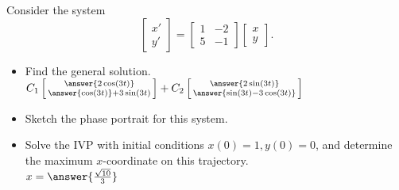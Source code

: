 \documentclass{ximera}
\begin{document}
\begin{exercise}
    Consider the system
    \begin{equation*}
        \begin{bmatrix} 
            x' \\ 
            y' 
        \end{bmatrix} 
        = 
        \begin{bmatrix} 
            1& -2 \\ 
            5 & -1 
        \end{bmatrix} 
        \begin{bmatrix} 
            x \\ 
            y 
        \end{bmatrix}.
    \end{equation*} %
    \begin{itemize}
        \item Find the general solution.\\
            $C_1\left[\begin{smallmatrix} \answer{2\cos(3t)} \\ \answer{\cos(3t)} + 3\sin(3t) \end{smallmatrix}\right] + C_2 \left[\begin{smallmatrix} \answer{2\sin(3t)} \\ \answer{\sin(3t) - 3\cos(3t)} \end{smallmatrix}\right]$
        \item Sketch the phase portrait for this system.
        \item Solve the IVP with initial conditions $x(0)=1, y(0)=0$, and determine the maximum $x$-coordinate on this trajectory.\\
            $x = \answer{\frac{\sqrt{10}}{3}}$
    \end{itemize}
\end{exercise}
\end{document}
